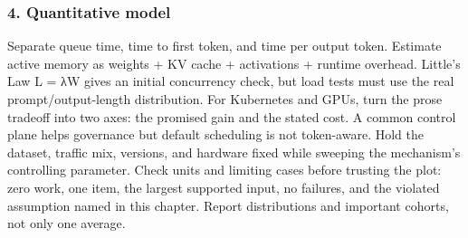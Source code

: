\subsubsection*{4. Quantitative model}
Separate queue time, time to first token, and time per output token. Estimate active memory as weights + KV cache + activations + runtime overhead. Little's Law L = λW gives an initial concurrency check, but load tests must use the real prompt/output-length distribution.
For Kubernetes and GPUs, turn the prose tradeoff into two axes: the promised gain and the stated cost. A common control plane helps governance but default scheduling is not token-aware. Hold the dataset, traffic mix, versions, and hardware fixed while sweeping the mechanism's controlling parameter.
Check units and limiting cases before trusting the plot: zero work, one item, the largest supported input, no failures, and the violated assumption named in this chapter. Report distributions and important cohorts, not only one average.
